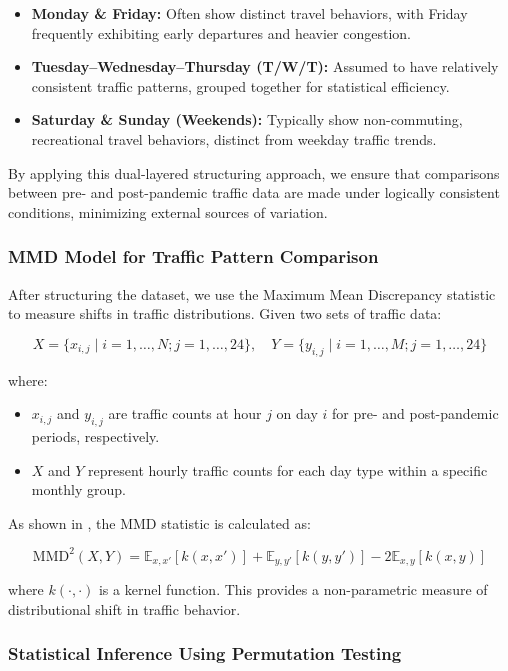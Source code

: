 \documentclass{article}
\begin{document}
\begin{itemize}
    \item \textbf{Monday \& Friday:} Often show distinct travel behaviors, with Friday frequently exhibiting early departures and heavier congestion.
    \item \textbf{Tuesday–Wednesday–Thursday (T/W/T):} Assumed to have relatively consistent traffic patterns, grouped together for statistical efficiency.
    \item \textbf{Saturday \& Sunday (Weekends):} Typically show non-commuting, recreational travel behaviors, distinct from weekday traffic trends.
\end{itemize}

By applying this dual-layered structuring approach, we ensure that comparisons between pre- and post-pandemic traffic data are made under logically consistent conditions, minimizing external sources of variation.

\subsubsection{MMD Model for Traffic Pattern Comparison}

After structuring the dataset, we use the Maximum Mean Discrepancy statistic to measure shifts in traffic distributions. Given two sets of traffic data:

\[
X = \{x_{i,j} \mid i = 1, \dots, N; j = 1, \dots, 24\}, \quad Y = \{y_{i,j} \mid i = 1, \dots, M; j = 1, \dots, 24\}
\]

where:

\begin{itemize}
    \item $x_{i,j}$ and $y_{i,j}$ are traffic counts at hour $j$ on day $i$ for pre- and post-pandemic periods, respectively.
    \item $X$ and $Y$ represent hourly traffic counts for each day type within a specific monthly group.
\end{itemize}

As shown in \cite{Gretton2019}, the MMD statistic is calculated as:

\[
\text{MMD}^2(X, Y) = \mathbb{E}_{x,x'}[k(x, x')] + \mathbb{E}_{y,y'}[k(y, y')] - 2\mathbb{E}_{x,y}[k(x, y)]
\]

where \( k(\cdot, \cdot) \) is a kernel function. This provides a non-parametric measure of distributional shift in traffic behavior.

\subsubsection{Statistical Inference Using Permutation Testing}
\end{document}
